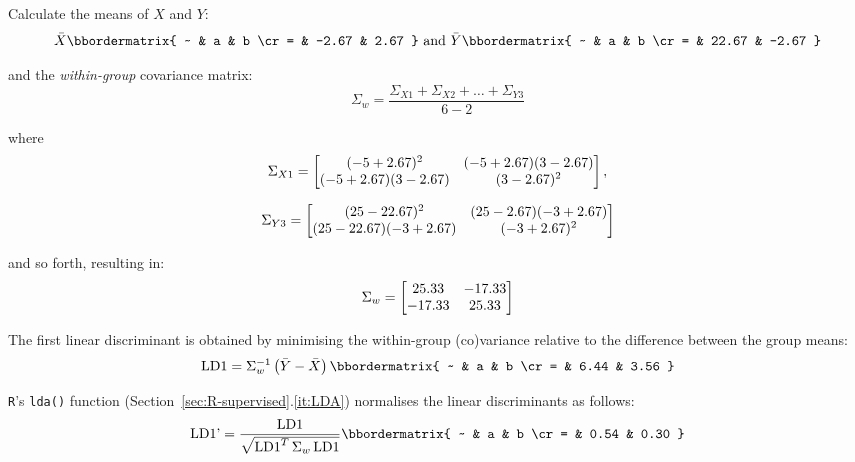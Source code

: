 Calculate the means of $X$ and $Y$:
\begin{equation}
  \bar{X} 
  \bbordermatrix{
    ~ & a & b \cr
    = & -2.67 & 2.67
  }
  \mbox{~and~}
  \bar{Y}
  \bbordermatrix{
    ~ & a & b \cr
    = & 22.67 & -2.67
  }
\end{equation}

\noindent and the \emph{within-group} covariance matrix:
\begin{equation}
  \Sigma_w = \frac{\Sigma_{X1} + \Sigma_{X2} + \ldots + \Sigma_{Y3}}{6-2}
\end{equation}

\noindent where
\begin{equation}
  \Sigma_{X1} =
  \left[
  \begin{array}{@{}cc@{}}
    (-5+2.67)^2 & (-5+2.67)(3-2.67) \cr
    (-5+2.67)(3-2.67) & (3-2.67)^2
  \end{array}
  \right],
\end{equation}

\begin{equation}
  \Sigma_{Y3} =
  \left[
  \begin{array}{@{}cc@{}}
    (25-22.67)^2 & (25-2.67)(-3+2.67) \cr
    (25-22.67)(-3+2.67) & (-3+2.67)^2
  \end{array}
  \right]
\end{equation}

\noindent and so forth, resulting in:
\begin{equation}
  \Sigma_w =   \left[
  \begin{array}{@{}cc@{}}
    25.33 & -17.33 \cr
    -17.33 & 25.33
  \end{array}
  \right]  
\end{equation}

The first linear discriminant is obtained by minimising the
within-group (co)variance relative to the difference between the group
means:
\begin{equation}
  \mbox{LD1} =
  \Sigma_w^{-1} \left(\bar{Y}-\bar{X}\right) 
  \bbordermatrix{
   ~ & a & b \cr
   = & 6.44 & 3.56
  }
  \label{eq:LD1}
\end{equation}

\texttt{R}'s \texttt{lda()} function
(Section~\ref{sec:R-supervised}.\ref{it:LDA}) normalises the linear
discriminants as follows:
\begin{equation}
  \mbox{LD1'} = \frac{\mbox{LD1}}{\sqrt{\mbox{LD1}^T\,\Sigma_w\,\mbox{LD1}}}
  \bbordermatrix{
    ~ & a & b \cr
    = & 0.54 & 0.30
  }
  \label{eq:LD1'}
\end{equation}

